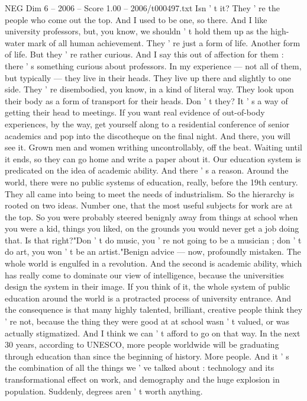 \begin{textsample}{NEG Dim 6 – 2006 – Score 1.00 – 2006/t000497.txt}
Isn ' t it?
They ' re the people who come out the top.
And I used to be one, so there.
And I like university professors, but, you know, we shouldn ' t hold them up as the high-water mark of all human achievement.
They ' re just a form of life.
Another form of life.
But they ' re rather curious.
And I say this out of affection for them : there ' s something curious about professors.
In my experience — not all of them, but typically — they live in their heads.
They live up there and slightly to one side.
They ' re disembodied, you know, in a kind of literal way.
They look upon their body as a form of transport for their heads.
Don ' t they?
It ' s a way of getting their head to meetings.
If you want real evidence of out-of-body experiences, by the way, get yourself along to a residential conference of senior academics and pop into the discotheque on the final night.
And there, you will see it.
Grown men and women writhing uncontrollably, off the beat.
Waiting until it ends, so they can go home and write a paper about it.
Our education system is predicated on the idea of academic ability.
And there ' s a reason.
Around the world, there were no public systems of education, really, before the 19th century.
They all came into being to meet the needs of industrialism.
So the hierarchy is rooted on two ideas.
Number one, that the most useful subjects for work are at the top.
So you were probably steered benignly away from things at school when you were a kid, things you liked, on the grounds you would never get a job doing that.
Is that right?"Don ' t do music, you ' re not going to be a musician ; don ' t do art, you won ' t be an artist."Benign advice — now, profoundly mistaken.
The whole world is engulfed in a revolution.
And the second is academic ability, which has really come to dominate our view of intelligence, because the universities design the system in their image.
If you think of it, the whole system of public education around the world is a protracted process of university entrance.
And the consequence is that many highly talented, brilliant, creative people think they ' re not, because the thing they were good at at school wasn ' t valued, or was actually stigmatized.
And I think we can ' t afford to go on that way.
In the next 30 years, according to UNESCO, more people worldwide will be graduating through education than since the beginning of history.
More people.
And it ' s the combination of all the things we ' ve talked about : technology and its transformational effect on work, and demography and the huge explosion in population.
Suddenly, degrees aren ' t worth anything.

\end{textsample}
